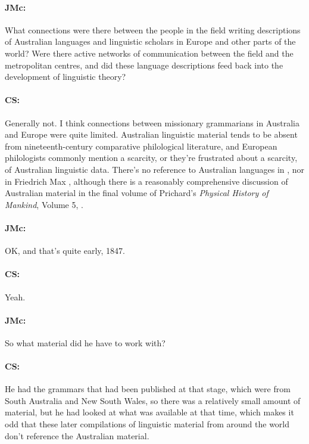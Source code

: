 \documentclass[output=paper]{langscibook}
\begin{document}
\paragraph*{JMc:}  What connections were there between the people in the field writing descriptions of Australian languages and linguistic scholars in Europe and other parts of the world? Were there active networks of communication between the field and the metropolitan centres, and did these language descriptions feed back into the development of linguistic theory?


\paragraph*{CS:}  Generally not. I think connections between missionary grammarians in Australia and Europe were quite limited. Australian linguistic material tends to be absent from nineteenth-century comparative philological literature, and European philologists commonly mention a scarcity, or they’re frustrated about a scarcity, of Australian linguistic data. There’s no reference to Australian languages in \citet{pott1884a}, nor in Friedrich Max \citet{mueller1864a}, although there is a reasonably comprehensive discussion of Australian material in the final volume of Prichard’s \textit{Physical History of Mankind}, Volume 5, \citeyear{prichard1847a}.


\paragraph*{JMc:}  OK, and that’s quite early, 1847.


\paragraph*{CS:}  Yeah.


\paragraph*{JMc:}  So what material did he have to work with?


\paragraph*{CS:} \begin{sloppypar}He had the grammars that had been published at that stage, which were from South Australia and New South Wales, so there was a relatively small amount of material, but he had looked at what was available at that time, which makes it odd that these later compilations of linguistic material from around the world don’t reference the Australian material.\end{sloppypar}
\end{document}
